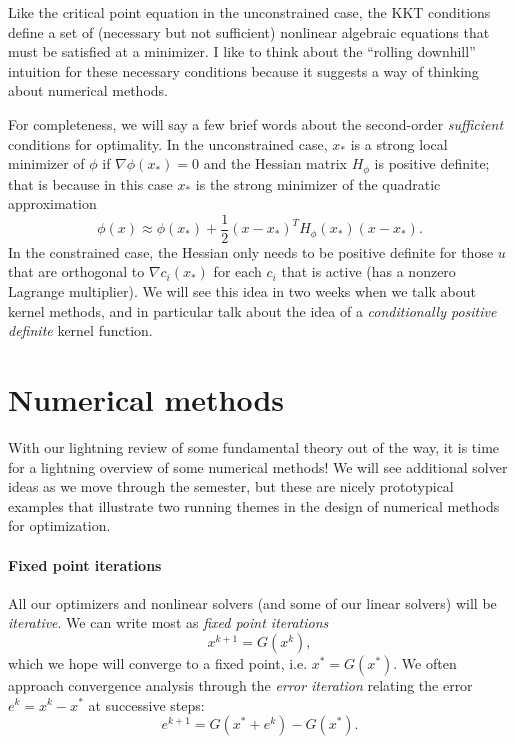 \documentclass[12pt, leqno]{article} %
\begin{document}
Like the critical point equation in the unconstrained case, the KKT
conditions define a set of (necessary but not sufficient) nonlinear
algebraic equations that must be satisfied at a minimizer.  I like to
think about the ``rolling downhill'' intuition for these necessary
conditions because it suggests a way of thinking about numerical
methods.

For completeness, we will say a few brief words about
the second-order {\em sufficient} conditions for optimality.
In the unconstrained case, $x_*$ is a strong
local minimizer of $\phi$ if $\nabla \phi(x_*) = 0$ and
the Hessian matrix $H_{\phi}$ is positive definite; that is because
in this case $x_*$ is the strong minimizer of the quadratic approximation
\[
  \phi(x) \approx \phi(x_*) + \frac{1}{2} (x-x_*)^T H_\phi(x_*) (x-x_*).
\]
In the constrained case, the Hessian only needs to be positive
definite for those $u$ that are orthogonal to $\nabla c_i(x_*)$
for each $c_i$ that is active (has a nonzero Lagrange multiplier).
We will see this idea in two weeks when we talk about kernel methods,
and in particular talk about the idea of
a {\em conditionally positive definite} kernel function.

\section{Numerical methods}

With our lightning review of some fundamental theory out of the way,
it is time for a lightning overview of some numerical methods!
We will see additional solver ideas as we move through the semester,
but these are nicely prototypical examples that illustrate two running
themes in the design of numerical methods for optimization.

\paragraph{Fixed point iterations}

All our optimizers and nonlinear solvers (and some of our linear
solvers) will be
{\em iterative}.  We can write most as {\em fixed point iterations}
\begin{equation}
  x^{k+1} = G(x^k), \label{eq:fixed-point}
\end{equation}
which we hope will converge to a fixed point, i.e. $x^* = G(x^*)$.
We often approach convergence analysis through the
{\em error iteration} relating the error $e^k = x^k-x^*$ at
successive steps:
\begin{equation}
  e^{k+1} = G(x^* + e^k)-G(x^*).
\end{equation}
\end{document}
